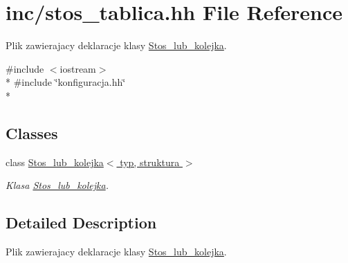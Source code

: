 \hypertarget{stos__tablica_8hh}{\section{inc/stos\-\_\-tablica.hh File Reference}
\label{stos__tablica_8hh}
}


Plik zawierajacy deklaracje klasy \hyperlink{class_stos__lub__kolejka}{Stos\-\_\-lub\-\_\-kolejka}.  


{\ttfamily \#include $<$iostream$>$}\\*
{\ttfamily \#include \char`\"{}konfiguracja.\-hh\char`\"{}}\\*
\subsection*{Classes}
\begin{DoxyCompactItemize}
\item 
class \hyperlink{class_stos__lub__kolejka}{Stos\-\_\-lub\-\_\-kolejka$<$ typ, struktura $>$}
\begin{DoxyCompactList}\small\item\em Klasa \hyperlink{class_stos__lub__kolejka}{Stos\-\_\-lub\-\_\-kolejka}. \end{DoxyCompactList}\end{DoxyCompactItemize}


\subsection{Detailed Description}
Plik zawierajacy deklaracje klasy \hyperlink{class_stos__lub__kolejka}{Stos\-\_\-lub\-\_\-kolejka}. 